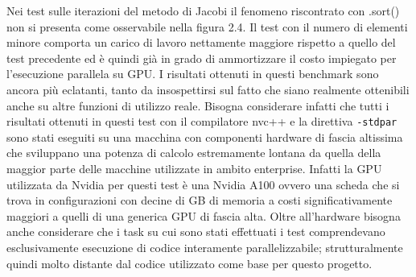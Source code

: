 \documentclass[12pt,a4paper]{report}
\begin{document}
\begin{figure}[H]
\centering
\begin{floatrow}[1]
\end{floatrow}
\end{figure} 

Nei test sulle iterazioni del metodo di Jacobi il fenomeno riscontrato con .sort() non si presenta come osservabile nella figura 2.4. Il test con il numero di elementi minore comporta un carico di lavoro nettamente maggiore rispetto a quello del test precedente ed è quindi già in grado di ammortizzare il costo impiegato per l'esecuzione parallela su GPU.
I risultati ottenuti in questi benchmark sono ancora più eclatanti, tanto da insospettirsi sul fatto che siano realmente ottenibili anche su altre funzioni di utilizzo reale. \newline
Bisogna considerare infatti che tutti i risultati ottenuti in questi test con il compilatore nvc++ e la direttiva \verb|-stdpar| sono stati eseguiti su una macchina con componenti hardware di fascia altissima che sviluppano una potenza di calcolo estremamente lontana da quella della maggior parte delle macchine utilizzate in ambito enterprise. Infatti la GPU utilizzata da Nvidia per questi test è una Nvidia A100 ovvero una scheda che si trova in configurazioni con decine di GB di memoria a costi significativamente maggiori a quelli di una generica GPU di fascia alta. \newline
Oltre all'hardware bisogna anche considerare che i task su cui sono stati effettuati i test comprendevano esclusivamente esecuzione di codice interamente parallelizzabile; strutturalmente quindi molto distante dal codice utilizzato come base per questo progetto.
\end{document}
